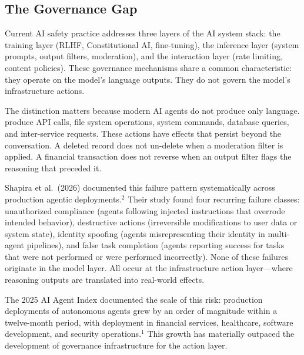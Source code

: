 \documentclass{IEEEcsmag}
\begin{document}
\subsection{The Governance Gap}

Current AI safety practice addresses three layers of the AI system stack: the training layer (RLHF, Constitutional AI, fine-tuning), the inference layer (system prompts, output filters, moderation), and the interaction layer (rate limiting, content policies). These governance mechanisms share a common characteristic: they operate on the model's language outputs. They do not govern the model's infrastructure actions.

The distinction matters because modern AI agents do not produce only language.   produce API calls, file system operations, system commands, database queries, and inter-service requests. These actions have effects that persist beyond the conversation. A deleted record does not un-delete when a moderation filter is applied. A financial transaction does not reverse when an output filter flags the reasoning that preceded it. 

Shapira et al.\ (2026) documented this failure pattern systematically across production agentic deployments.$^{2}$ Their study found four recurring failure classes: unauthorized compliance (agents following injected instructions that overrode intended behavior), destructive actions (irreversible modifications to user data or system state), identity spoofing (agents misrepresenting their identity in multi-agent pipelines), and false task completion (agents reporting success for tasks that were not performed or were performed incorrectly). None of these failures originate in the model layer. All occur at the infrastructure action layer---where reasoning outputs are translated into real-world effects.

The 2025 AI Agent Index documented the scale of this risk: production deployments of autonomous agents grew by an order of magnitude within a twelve-month period, with deployment in financial services, healthcare, software development, and security operations.$^{1}$ This growth has materially outpaced the development of governance infrastructure for the action layer.
\end{document}
